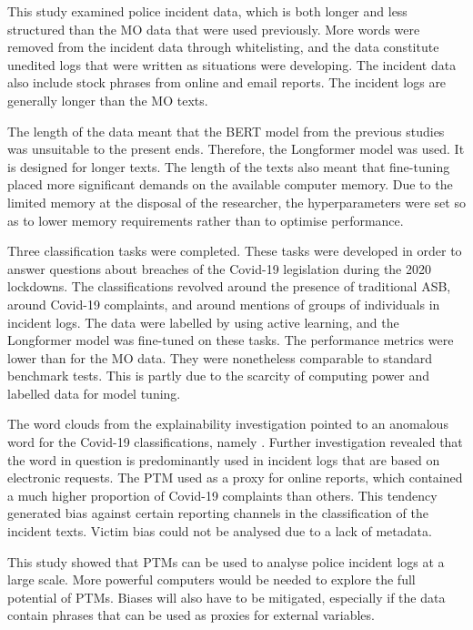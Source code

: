 This study examined police incident data, which is both longer and less structured than the MO data that were used previously. More words were removed from the incident data through whitelisting, and the data constitute unedited logs that were written as situations were developing. The incident data also include stock phrases from online and email reports. The incident logs are generally longer than the MO texts.

The length of the data meant that the BERT model from the previous studies was unsuitable to the present ends. Therefore, the Longformer model was used. It is designed for longer texts. The length of the texts also meant that fine-tuning placed more significant demands on the available computer memory. Due to the limited memory at the disposal of the researcher, the hyperparameters were set so as to lower memory requirements rather than to optimise performance.

Three classification tasks were completed. These tasks were developed in order to answer questions about breaches of the Covid-19 legislation during the 2020 lockdowns. The classifications revolved around the presence of traditional ASB, around Covid-19 complaints, and around mentions of groups of individuals in incident logs. The data were labelled by using active learning, and the Longformer model was fine-tuned on these tasks. The performance metrics were lower than for the MO data. They were nonetheless comparable to standard benchmark tests. This is partly due to the scarcity of computing power and labelled data for model tuning.

The word clouds from the explainability investigation pointed to an anomalous word for the Covid-19 classifications, namely . Further investigation revealed that the word in question is predominantly used in incident logs that are based on electronic requests. The PTM used  as a proxy for online reports, which contained a much higher proportion of Covid-19 complaints than others. This tendency generated bias against certain reporting channels in the classification of the incident texts. Victim bias could not be analysed due to a lack of metadata.

This study showed that PTMs can be used to analyse police incident logs at a large scale. More powerful computers would be needed to explore the full potential of PTMs. Biases will also have to be mitigated, especially if the data contain phrases that can be used as proxies for external variables.

